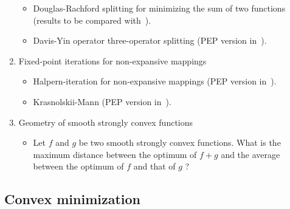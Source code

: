 \documentclass[11pt,a4paper]{article}
\begin{document}
\begin{enumerate}
\begin{itemize}
		\item Douglas-Rachford splitting for minimizing the sum of two functions (results to be compared with~\cite{giselsson2016linear}).
		\item Davis-Yin operator three-operator splitting (PEP version in~\cite{ryu2018operator}).
	\end{itemize}
	\item Fixed-point iterations for non-expansive mappings
	\begin{itemize}
		\item Halpern-iteration for non-expansive mappings (PEP version in~\cite{lieder2017convergence}).
		\item Krasnolskii-Mann (PEP version in~\cite{lieder2018}).
	\end{itemize}	
	\item Geometry of smooth strongly convex functions
	\begin{itemize}
		\item Let $f$ and $g$ be two smooth strongly convex functions. What is the maximum distance between the optimum of $f+g$ and the average between the optimum of $f$ and that of $g$ ?
	\end{itemize}
\end{enumerate}
\newpage
\subsection{Convex minimization}
\end{document}
